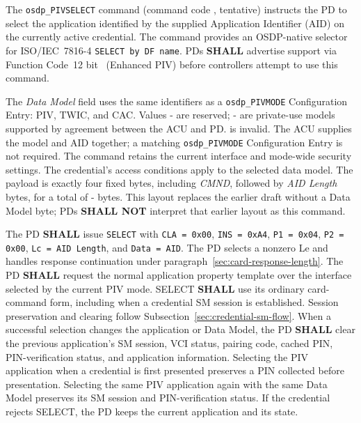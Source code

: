 The \texttt{osdp\_PIVSELECT} command (command code , tentative) instructs the PD to select the application identified by the supplied Application Identifier (AID) on the currently active credential. The command provides an OSDP-native selector for ISO/IEC~7816-4 \texttt{SELECT by DF name}. PDs \textbf{SHALL} advertise support via Function Code~12 bit~ (Enhanced PIV) before controllers attempt to use this command.



The \emph{Data Model} field uses the same identifiers as a
\texttt{osdp\_PIVMODE} Configuration Entry:  PIV,  TWIC,
and  CAC. Values - are reserved;
- are private-use models supported by agreement between
the ACU and PD.  is invalid. The ACU supplies the model and AID
together; a matching \texttt{osdp\_PIVMODE} Configuration Entry is not required.
The command retains the current interface and mode-wide security settings.
The credential's access conditions apply to the selected data model.
The payload is exactly four fixed bytes, including \emph{CMND}, followed by
\emph{AID Length} bytes, for a total of - bytes.
This layout replaces the earlier draft without a Data Model byte; PDs
\textbf{SHALL NOT} interpret that earlier layout as this command.

The PD \textbf{SHALL} issue \texttt{SELECT} with \texttt{CLA = 0x00},
\texttt{INS = 0xA4}, \texttt{P1 = 0x04}, \texttt{P2 = 0x00},
\texttt{Lc = AID Length}, and \texttt{Data = AID}. The PD selects a nonzero
Le and handles response continuation under
paragraph~\ref{sec:card-response-length}.
The PD \textbf{SHALL} request the normal application property template over the interface selected
by the current PIV mode. SELECT \textbf{SHALL} use its ordinary card-command form,
including when a credential SM session is established. Session preservation and
clearing follow Subsection~\ref{sec:credential-sm-flow}.
When a successful selection changes the application or Data Model, the PD \textbf{SHALL} clear the
previous application's SM session, VCI status, pairing code, cached PIN,
PIN-verification status, and application information.
Selecting the PIV application when a credential is first presented preserves a PIN
collected before presentation. Selecting the same PIV application again with the same Data Model preserves
its SM session and PIN-verification status. If the credential rejects SELECT, the PD
keeps the current application and its state.

